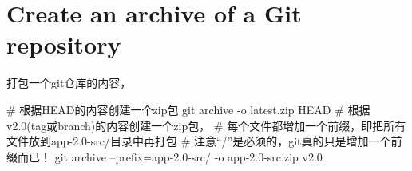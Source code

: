 ﻿\section[Git archive]{Create an archive of a Git repository}
打包一个git仓库的内容，

\begin{bashcode}
# 根据HEAD的内容创建一个zip包
git archive -o latest.zip HEAD
# 根据v2.0(tag或branch)的内容创建一个zip包，
# 每个文件都增加一个前缀，即把所有文件放到app-2.0-src/目录中再打包
# 注意“/”是必须的，git真的只是增加一个前缀而已！
git archive --prefix=app-2.0-src/ -o app-2.0-src.zip v2.0
\end{bashcode}